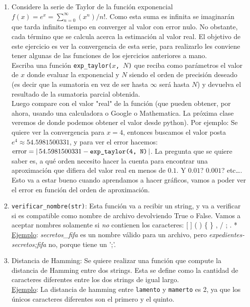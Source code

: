 \documentclass[a4paper]{article}
\begin{document}
\begin{enumerate}
\item Considere la serie de Taylor de la función exponencial $f(x)=e^x=\sum\limits_{n=0}^{\infty} (x^n) / n!$. Como esta suma es infinita se imaginarán que tarda infinito tiempo en converger al valor con error nulo. No obstante, cada término que se calcula acerca la estimación al valor real. El objetivo de este ejercicio es ver la convergencia de esta serie, para realizarlo les conviene tener algunas de las funciones de los ejercicios anteriores a mano.\\
	Escriba una función \texttt{exp\_taylor($x$, $N$)} que reciba como parámetros el valor de $x$ donde evaluar la exponencial y $N$ siendo el orden de precisión deseado (es decir que la sumatoria en vez de ser hasta $\infty$ será hasta $N$) y devuelva el resultado de la sumatoria parcial obtenida.\\
	Luego compare con el valor "real" de la función (que pueden obtener, por ahora, usando una calculadora o Google o Mathematica. La próxima clase veremos de donde podemos obtener el valor desde python). Por ejemplo: Se quiere ver la convergencia para $x=4$, entonces buscamos el valor posta $e^4 \approx 54.5981500331$, y para ver el error hacemos: $\textup{error} = |\,54.5981500331 - \texttt{exp\_taylor(4, N)}\,|$.
	La pregunta que se quiere saber es, a qué orden necesito hacer la cuenta para encontrar una aproximación que difiera del valor real en menos de $0.1$. Y $0.01$? $0.001$? etc\ldots.\\
	Esto va a estar bueno cuando aprendamos a hacer gráficos, vamos a poder ver el error en función del orden de aproximación.

\item \texttt{verificar\_nombre(str)}: Esta función va a recibir un string, y va a verificar si es compatible como nombre de archivo devolviendo True o False. Vamos a aceptar nombres solamente si \emph{no} contienen los caracteres: [ ] ( ) \{ \} , / ; . * \\
\underline{Ejemplo}: \textit{secretos\_fifa} es un nombre válido para un archivo, pero \textit{expedientes-secretos;fifa} no, porque tiene un ';'.

\item  Distancia de Hamming: Se quiere realizar una función que compute la distancia de Hamming entre dos strings. Esta se define como la cantidad de caracteres diferentes entre los dos strings de igual largo.\\
\underline{Ejemplo}: La distancia de hamming entre \texttt{lamento} y \texttt{mamerto} es 2, ya que los únicos caracteres diferentes son el primero y el quinto.


\end{enumerate}
\end{document}
